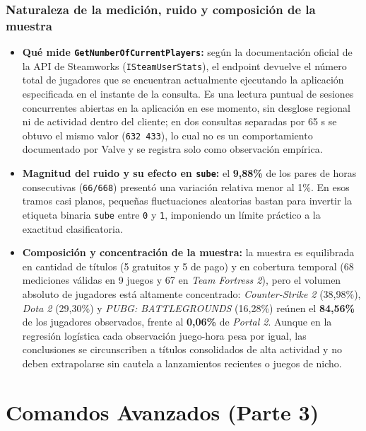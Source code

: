 \documentclass[11pt,a4paper]{article}
\begin{document}
\subsubsection{Naturaleza de la medición, ruido y composición de la muestra}
\begin{itemize}
    \item \textbf{Qué mide \texttt{GetNumberOfCurrentPlayers}:} según la documentación oficial de la API de Steamworks (\texttt{ISteamUserStats}), el endpoint devuelve el número total de jugadores que se encuentran actualmente ejecutando la aplicación especificada en el instante de la consulta. Es una lectura puntual de sesiones concurrentes abiertas en la aplicación en ese momento, sin desglose regional ni de actividad dentro del cliente; en dos consultas separadas por 65 s se obtuvo el mismo valor (\texttt{632\,433}), lo cual no es un comportamiento documentado por Valve y se registra solo como observación empírica.
    
    \item \textbf{Magnitud del ruido y su efecto en \texttt{sube}:} el \textbf{9,88\%} de los pares de horas consecutivas (\texttt{66/668}) presentó una variación relativa menor al 1\%. En esos tramos casi planos, pequeñas fluctuaciones aleatorias bastan para invertir la etiqueta binaria \texttt{sube} entre \texttt{0} y \texttt{1}, imponiendo un límite práctico a la exactitud clasificatoria.
    \item \textbf{Composición y concentración de la muestra:} la muestra es equilibrada en cantidad de títulos (5 gratuitos y 5 de pago) y en cobertura temporal (68 mediciones válidas en 9 juegos y 67 en \emph{Team Fortress 2}), pero el volumen absoluto de jugadores está altamente concentrado: \emph{Counter-Strike 2} (38,98\%), \emph{Dota 2} (29,30\%) y \emph{PUBG: BATTLEGROUNDS} (16,28\%) reúnen el \textbf{84,56\%} de los jugadores observados, frente al \textbf{0,06\%} de \emph{Portal 2}. Aunque en la regresión logística cada observación juego-hora pesa por igual, las conclusiones se circunscriben a títulos consolidados de alta actividad y no deben extrapolarse sin cautela a lanzamientos recientes o juegos de nicho.
\end{itemize}

\section{Comandos Avanzados (Parte 3)}
\end{document}
